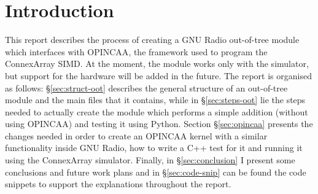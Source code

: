 
\section{Introduction}
	This report describes the process of creating a GNU Radio out-of-tree  module
	which interfaces with OPINCAA\cite{opincaa-paper}, the framework used to program
	the ConnexArray SIMD\cite{connex-paper}. At the moment, the module works only
	with the simulator, but support for the hardware will be added in the future. 
	The report is organised as follows: 
	\S\ref{sec:struct-oot} describes the general structure of an out-of-tree 
	module and the main files that it contains, while in \S\ref{sec:steps-oot} lie
	the steps needed to actually create the module which performs a simple
	addition (without using OPINCAA) and testing it using Python.
	Section \S\ref{sec:opincaa} presents the changes needed in order to
	create an OPINCAA kernel with a similar functionality inside GNU Radio, how to
	write a C++ test for it and running it using the ConnexArray simulator.
	Finally, in \S\ref{sec:conclusion} I present some conclusions and future work
	plans and in \S\ref{sec:code-snip} can be found the code snippets to
	support the explanations throughout the report.
